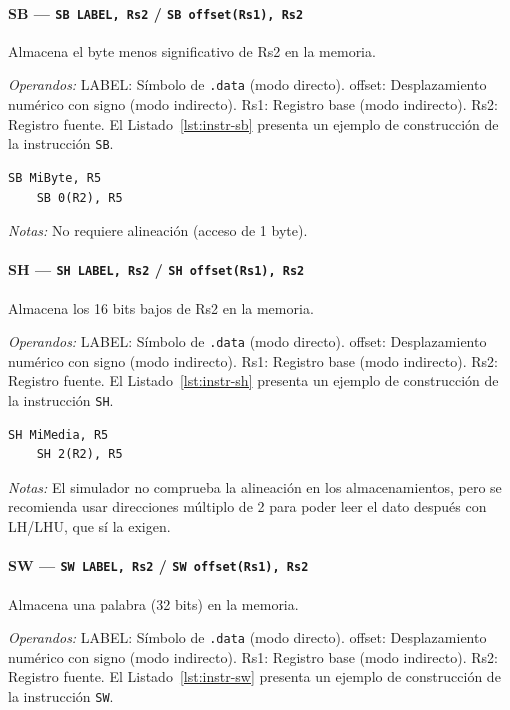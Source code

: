 \documentclass[../main.tex]{subfiles}
\begin{document}
\paragraph*{SB --- \texttt{SB LABEL, Rs2} / \texttt{SB offset(Rs1), Rs2}}
Almacena el byte menos significativo de Rs2 en la memoria.

\textit{Operandos:} LABEL: Símbolo de \texttt{.data} (modo directo). offset: Desplazamiento numérico con signo (modo indirecto). Rs1: Registro base (modo indirecto). Rs2: Registro fuente.
El Listado~\ref{lst:instr-sb} presenta un ejemplo de construcción de la instrucción \texttt{SB}.

\begin{lstlisting}[caption={SB},label={lst:instr-sb}]
	SB MiByte, R5
	SB 0(R2), R5
\end{lstlisting}
\textit{Notas:} No requiere alineación (acceso de 1 byte).

\paragraph*{SH --- \texttt{SH LABEL, Rs2} / \texttt{SH offset(Rs1), Rs2}}
Almacena los 16 bits bajos de Rs2 en la memoria.

\textit{Operandos:} LABEL: Símbolo de \texttt{.data} (modo directo). offset: Desplazamiento numérico con signo (modo indirecto). Rs1: Registro base (modo indirecto). Rs2: Registro fuente.
El Listado~\ref{lst:instr-sh} presenta un ejemplo de construcción de la instrucción \texttt{SH}.

\begin{lstlisting}[caption={SH},label={lst:instr-sh}]
	SH MiMedia, R5
	SH 2(R2), R5
\end{lstlisting}
\textit{Notas:} El simulador no comprueba la alineación en los almacenamientos, pero se recomienda usar direcciones múltiplo de 2 para poder leer el dato después con LH/LHU, que sí la exigen.

\paragraph*{SW --- \texttt{SW LABEL, Rs2} / \texttt{SW offset(Rs1), Rs2}}
Almacena una palabra (32 bits) en la memoria.

\textit{Operandos:} LABEL: Símbolo de \texttt{.data} (modo directo). offset: Desplazamiento numérico con signo (modo indirecto). Rs1: Registro base (modo indirecto). Rs2: Registro fuente.
El Listado~\ref{lst:instr-sw} presenta un ejemplo de construcción de la instrucción \texttt{SW}.
\end{document}
